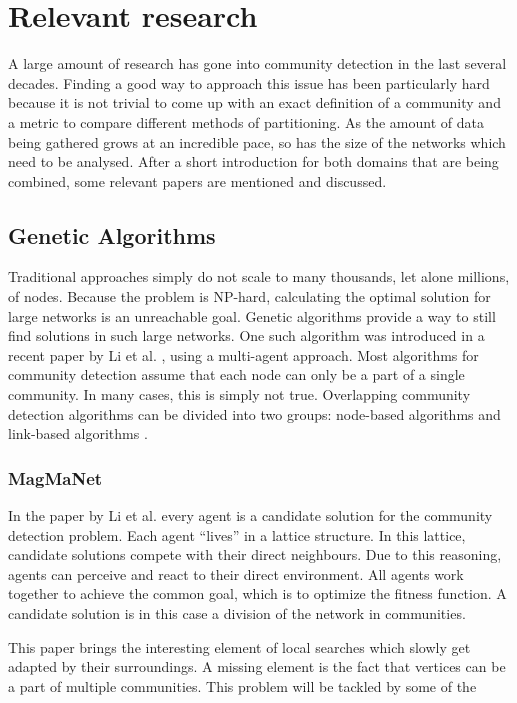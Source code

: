 \section{Relevant research}
\label{chapter:relevantResearch}
A large amount of research has gone into community detection in the last several decades. 
Finding a good way to approach this issue has been particularly hard because it is not trivial to come up with an exact definition of a community and a metric to compare different methods of partitioning. 
As the amount of data being gathered grows at an incredible pace, so has the size of the networks which need to be analysed. 
After a short introduction for both domains that are being combined, some relevant papers are mentioned and discussed. \\

\subsection{Genetic Algorithms}
Traditional approaches simply do not scale to many thousands, let alone millions, of nodes. 
Because the problem is NP-hard, calculating the optimal solution for large networks is an unreachable goal.
Genetic algorithms provide a way to still find solutions in such large networks. 
One such algorithm was introduced in a recent paper by Li et al. \cite{multiagent2016}, using a multi-agent approach. 
Most algorithms for community detection assume that each node can only be a part of a single community. 
In many cases, this is simply not true. 
Overlapping community detection algorithms can be divided into two groups: node-based algorithms and link-based algorithms \cite{linkclus2013}.\\

\subsubsection{MagMaNet}
In the paper by Li et al. \cite{multiagent2016} every agent is a candidate solution for the community detection problem.
Each agent ``lives'' in a lattice structure. 
In this lattice, candidate solutions compete with their direct neighbours.
Due to this reasoning, agents can perceive and react to their direct environment.
All agents work together to achieve the common goal, which is to optimize the fitness function.
A candidate solution is in this case a division of the network in communities.

This paper brings the interesting element of local searches which slowly get adapted by their surroundings.
A missing element is the fact that vertices can be a part of multiple communities.
This problem will be tackled by some of the 


